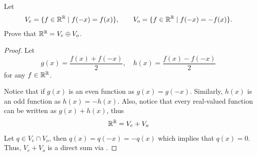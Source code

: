 \begin{exercise}
    Let
    \[
        V_e = \{f \in \mathbb{R}^{\mathbb{R}} \mid f(-x)=f(x)\},
        \qquad
        V_o = \{f \in \mathbb{R}^{\mathbb{R}} \mid f(-x)=-f(x)\}.
    \]
    Prove that $\mathbb{R}^{\mathbb{R}} = V_e \oplus V_o$.
\end{exercise}

\begin{proof}
    Let 
    \[ g(x)= \frac{f(x)+f(-x)}{2}, \quad h(x)=\frac{f(x)-f(-x)}{2} \] 
    for any $f \in \mathbb{R}^{\mathbb{R}}$.

    Notice that if $g(x)$ is an even function as $g(x)=g(-x)$.
    Similarly, $h(x)$ is an odd function as $h(x)=-h(x)$.
    Also, notice that every real-valued function can be written as $g(x)+h(x)$, thus
    \[ \mathbb{R}^{\mathbb{R}} = V_e + V_o \]
    Let $q \in V_e \cap V_o$, then $q(x)=q(-x)=-q(x)$ which implies that $q(x)=0$. Thus, $V_e + V_o$ is a direct sum via 
    .
\end{proof}